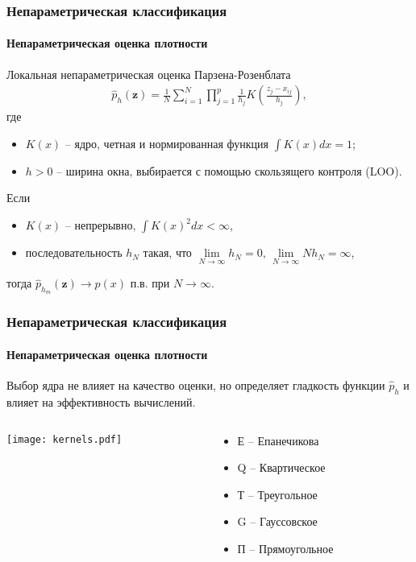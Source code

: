 \documentclass{beamer}
\begin{document}
\begin{frame}
  \frametitle{Непараметрическая классификация}
  \framesubtitle{Непараметрическая оценка плотности}
  Локальная непараметрическая оценка Парзена-Розенблата
  \begin{align*}
     \widehat{p}_h(\mathbf{z}) = \frac{1}{N}\sum_{i = 1}^N \prod_{j = 1}^p \frac{1}{h_j}K \left(\frac{z_j - x_{ij}}{h_j}\right),
  \end{align*}
где
\begin{itemize}
  \item $K(x)$ -- ядро, четная и нормированная функция $\int K(x) dx = 1$;
  \item $h > 0$ -- ширина окна, выбирается с помощью скользящего контроля (LOO).
\end{itemize}
\bigskip
Если
\begin{itemize}
  \item $K(x)$ -- непрерывно, $\int K(x)^2 dx < \infty$,
  \item последовательность $h_N$ такая, что $\lim\limits_{N \rightarrow \infty}h_N = 0$, $\lim\limits_{N \rightarrow \infty} Nh_N = \infty$,
\end{itemize}
тогда $\widehat{p}_{h_m}(\mathbf{z}) \rightarrow p(x)$ п.в. при $N \rightarrow \infty$.
\end{frame}
\begin{frame}
  \frametitle{Непараметрическая классификация}
  \framesubtitle{Непараметрическая оценка плотности}
Выбор ядра не влияет на качество оценки, но определяет гладкость функции $\widehat{p}_{h}$ и влияет на эффективность вычислений.
\bigskip
\begin{columns}
\begin{column}{0.5\textwidth}
   \texttt{[image: kernels.pdf]}
\end{column}
\begin{column}{0.5\textwidth}  %
\begin{itemize}
  \item Е -- Епанечикова
  \item Q -- Квартическое
  \item Т -- Треугольное
  \item G -- Гауссовское
  \item П -- Прямоугольное
\end{itemize}
\end{column}
\end{columns}
\end{frame}
\end{document}
